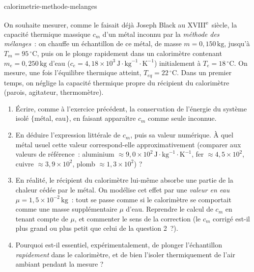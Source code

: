 \begin{exo}{calorimetrie-methode-melanges}

On souhaite mesurer, comme le faisait déjà Joseph Black au XVIII\textsuperscript{e}~siècle, la capacité thermique massique $c_m$ d'un métal inconnu par la \emph{méthode des mélanges}~: on chauffe un échantillon de ce métal, de masse $m = 0{,}150\,\text{kg}$, jusqu'à $T_m = 95\,^\circ\text{C}$, puis on le plonge rapidement dans un calorimètre contenant $m_e = 0{,}250\,\text{kg}$ d'eau ($c_e = 4{,}18\times10^3\,\text{J}\!\cdot\!\text{kg}^{-1}\!\cdot\!\text{K}^{-1}$) initialement à $T_e = 18\,^\circ\text{C}$. On mesure, une fois l'équilibre thermique atteint, $T_{eq} = 22\,^\circ\text{C}$. Dans un premier temps, on néglige la capacité thermique propre du récipient du calorimètre (parois, agitateur, thermomètre).

\begin{enumerate}
  \item Écrire, comme à l'exercice précédent, la conservation de l'énergie du système isolé $\{$métal, eau$\}$, en faisant apparaître $c_m$ comme seule inconnue.
  \item En déduire l'expression littérale de $c_m$, puis sa valeur numérique. À quel métal usuel cette valeur correspond-elle approximativement (comparer aux valeurs de référence~: aluminium $\approx 9{,}0\times10^2\,\text{J}\!\cdot\!\text{kg}^{-1}\!\cdot\!\text{K}^{-1}$, fer $\approx 4{,}5\times10^2$, cuivre $\approx 3{,}9\times10^2$, plomb $\approx 1{,}3\times10^2$) ?
  \item En réalité, le récipient du calorimètre lui-même absorbe une partie de la chaleur cédée par le métal. On modélise cet effet par une \emph{valeur en eau} $\mu = 1{,}5\times10^{-2}\,\text{kg}$~: tout se passe comme si le calorimètre se comportait comme une masse supplémentaire $\mu$ d'eau. Reprendre le calcul de $c_m$ en tenant compte de $\mu$, et commenter le sens de la correction (le $c_m$ corrigé est-il plus grand ou plus petit que celui de la question 2~?).
  \item Pourquoi est-il essentiel, expérimentalement, de plonger l'échantillon \emph{rapidement} dans le calorimètre, et de bien l'isoler thermiquement de l'air ambiant pendant la mesure ?
\end{enumerate}


\end{exo}

